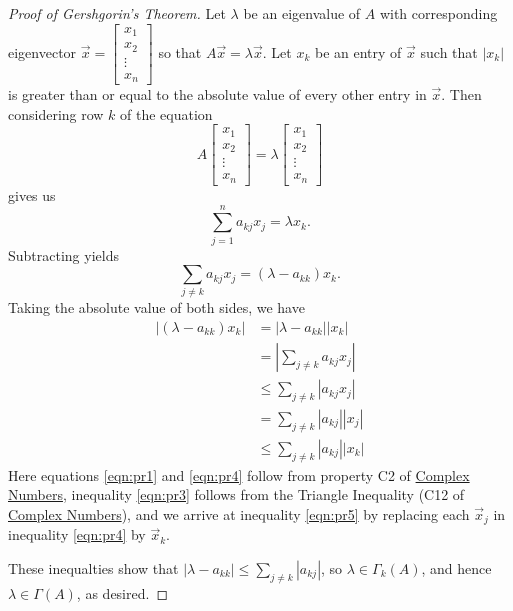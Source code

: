 \documentclass{ximera}
\begin{document}
\begin{proof}[Proof of Gershgorin's Theorem]
Let $\lambda$ be an eigenvalue of $A$ with corresponding eigenvector $\vec{x}=\begin{bmatrix}
x_1 \\ x_2 \\ \vdots \\ x_n
\end{bmatrix}$ so that $A\vec{x}=\lambda\vec{x}$. Let $x_k$ be an entry of $\vec{x}$ such that $|x_k|$ is greater than or equal to the absolute value of every other entry in $\vec{x}$.  Then considering row $k$ of the equation $$A\begin{bmatrix}
x_1 \\ x_2 \\ \vdots \\ x_n
\end{bmatrix}=\lambda\begin{bmatrix}
x_1 \\ x_2 \\ \vdots \\ x_n
\end{bmatrix}$$ gives us 
$$\sum_{j=1}^n a_{kj} x_j = \lambda x_k.$$
Subtracting yields 
$$\sum_{j\ne k} a_{kj} x_j = (\lambda - a_{kk}) x_k.$$
Taking the absolute value of both sides, we have
\begin{align}
    |(\lambda - a_{kk})x_k| &= |\lambda - a_{kk}| |x_k|\label{eqn:pr1} \\ 
    &= \left|\sum_{j\ne k} a_{kj} x_j\right| \label{eqn:pr2} \\ 
    &\le \sum_{j\ne k} |a_{kj} x_j| \label{eqn:pr3} \\ 
    &= \sum_{j\ne k} |a_{kj}| |x_j| \label{eqn:pr4}\\ 
    &\le \sum_{j\ne k} |a_{kj}| |x_k| \label{eqn:pr5}
\end{align}
Here equations \ref{eqn:pr1} and \ref{eqn:pr4} follow from property C2 of %
\href{https://ximera.osu.edu/linearalgebradzv3/LinearAlgebraInteractiveIntro/APX-0020/main}{Complex Numbers}, inequality \ref{eqn:pr3} follows from the Triangle Inequality (C12 of %
\href{https://ximera.osu.edu/linearalgebradzv3/LinearAlgebraInteractiveIntro/APX-0020/main}{Complex Numbers}), and we arrive at inequality \ref{eqn:pr5} by replacing each $\vec{x}_j$ in inequality \ref{eqn:pr4} by $\vec{x}_k$.

These inequalties show that $|\lambda - a_{kk}| \le \sum_{j\ne k} |a_{kj}|$, so $\lambda \in \Gamma_k(A)$, and hence $\lambda \in \Gamma(A)$, as desired.

\end{proof}
\end{document}
